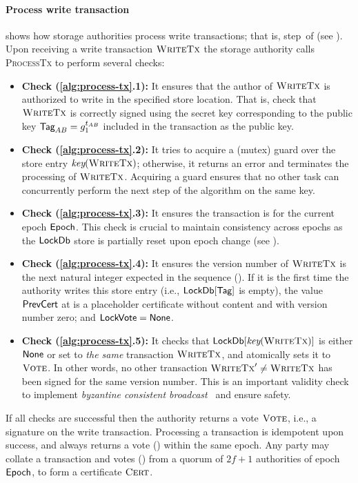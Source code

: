 \paragraph{Process write transaction}
 shows how storage authorities process write transactions; that is, step~\three of  (see ).
%
Upon receiving a write transaction $\textsc{WriteTx}$ the storage authority calls \textsc{ProcessTx} to perform several checks:
\begin{itemize}
    \item \textbf{Check (\ref{alg:process-tx}.1):} It ensures that the author of  $\textsc{WriteTx}$ is authorized to write in the specified store location. That is, check that $\textsc{WriteTx}$ is correctly signed using the secret key corresponding to the public key $\textsf{Tag}_{AB} = g_1^{t_{AB}}$ included in the transaction as the public key.
    \item \textbf{Check (\ref{alg:process-tx}.2):} It tries to acquire a (mutex) guard over the store entry $\emph{key}(\textsc{WriteTx})$; otherwise, it returns an error and terminates the processing of $\textsc{WriteTx}$. Acquiring a guard ensures that no other task can concurrently perform the next step of the algorithm on the same key.
    \item \textbf{Check (\ref{alg:process-tx}.3):} It ensures the transaction is for the current epoch $\textsf{Epoch}$. This check is crucial to maintain consistency across epochs as the $\textsf{LockDb}$ store is partially reset upon epoch change (see ).
    \item \textbf{Check (\ref{alg:process-tx}.4):} It ensures the version number of $\textsc{WriteTx}$ is the next natural integer expected in the sequence (). If it is the first time the authority writes this store entry (i.e., $\textsf{LockDb}[\textsf{Tag}]$ is empty), the value $\textsf{PrevCert}$ at  is a placeholder certificate without content and with version number zero; and $\textsf{LockVote} = \textsf{None}$.
    \item \textbf{Check (\ref{alg:process-tx}.5):} It checks that $\textsf{LockDb}[\emph{key}(\textsc{WriteTx})]$ is either $\textsf{None}$ or set to \emph{the same} transaction $\textsc{WriteTx}$, and atomically sets it to $\textsc{Vote}$. In other words, no other transaction $\textsc{WriteTx}' \neq \textsc{WriteTx}$ has been signed for the same version number. This is an important validity check to implement \emph{byzantine consistent broadcast}~\cite{cachin2011introduction} and ensure safety.
\end{itemize}
If all checks are successful then the authority returns a vote $\textsc{Vote}$, i.e., a signature on the write transaction. Processing a transaction is idempotent upon success, and always returns a vote (\vote) within the same epoch. Any party may collate a transaction and votes (\vote) from a quorum of $2f+1$ authorities of epoch $\textsf{Epoch}$, to form a certificate $\textsc{Cert}$.
